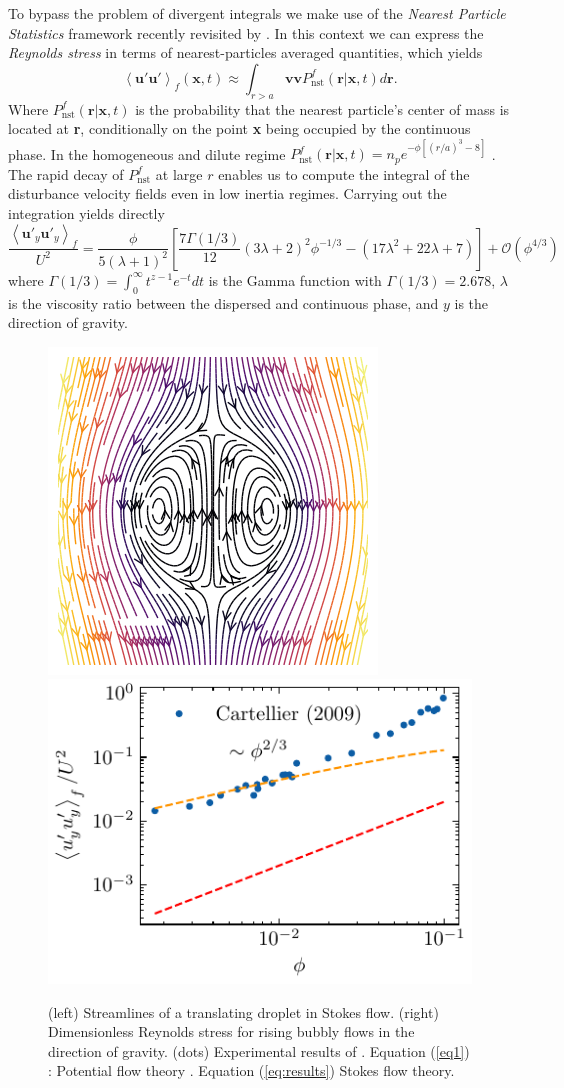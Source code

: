 \documentclass[a4paper,11pt]{article}
\newcommand{\avg}[1]{\left<#1\right>}
\theoremstyle{mytheoremstyle}
\theoremstyle{mytheoremstyle}
\theoremstyle{myproblemstyle}
\begin{document}
To bypass the problem of divergent integrals we make use of the  \textit{Nearest Particle Statistics} framework recently revisited by \cite{zhang2021ensemble}. 
In this context we can express the \textit{Reynolds stress} in terms of nearest-particles averaged quantities, which yields
\begin{equation*}
    \avg{\textbf{u}'\textbf{u}'}_f(\textbf{x},t)
    \approx
    \int_{r >a}  \textbf{v}  \textbf{v} P_\text{nst}^f(\textbf{r}|\textbf{x},t) d\textbf{r}.
\end{equation*}
Where $P_\text{nst}^f(\textbf{r}|\textbf{x},t)$ is the probability that the nearest particle's center of mass is located at \textbf{r}, conditionally on the point \textbf{x} being occupied by the continuous phase.
In the homogeneous and dilute regime $P_\text{nst}^f(\textbf{r}|\textbf{x},t) = n_p e^{- \phi [(r/a)^3 - 8]}$ \cite{zhang2021ensemble}.
The rapid decay of $P_\text{nst}^f$ at large $r$ enables us to compute the integral of the disturbance velocity fields even in low inertia regimes. 
Carrying out the integration yields directly 
\begin{equation}
    \frac{\avg{\textbf{u}'_y\textbf{u}'_y}_f}{U^2}
    = \frac{\phi}{5(\lambda +1)^2}\left[
        \frac{7 \Gamma\left(1/3\right)}{12}(3\lambda+2)^2    \phi^{-1/3}
        - (17\lambda^2+22\lambda+7)
        \right]
        + \mathcal{O}(\phi^{4/3})
        \label{eq:results}
\end{equation}
where $\Gamma(1/3) = \int_0^\infty t^{z-1} e^{-t} dt$ is the Gamma function with $\Gamma(1/3)= 2.678$, $\lambda$ is the viscosity ratio between the dispersed and continuous phase, and $y$ is the direction of gravity. 
\begin{figure}[h!]
    \centering
    \includegraphics[height=0.3\textwidth]{image/Rising_Stokes.png}
    \includegraphics[height=0.3\textwidth]{image/HOMOGENEOUS_NEW/CA/cartellier.pdf}
    \caption{(left) Streamlines of a translating droplet in Stokes flow. 
            (right) Dimensionless Reynolds stress for rising bubbly flows in the direction of gravity. 
            (dots) Experimental results of \cite{cartellier2009induced}. 
            Equation (\ref{eq1}) : Potential flow theory \cite{van1982bubble}. 
            Equation (\ref{eq:results}) Stokes flow theory. 
            }
    \label{fig:wake}
\end{figure}
\end{document}
